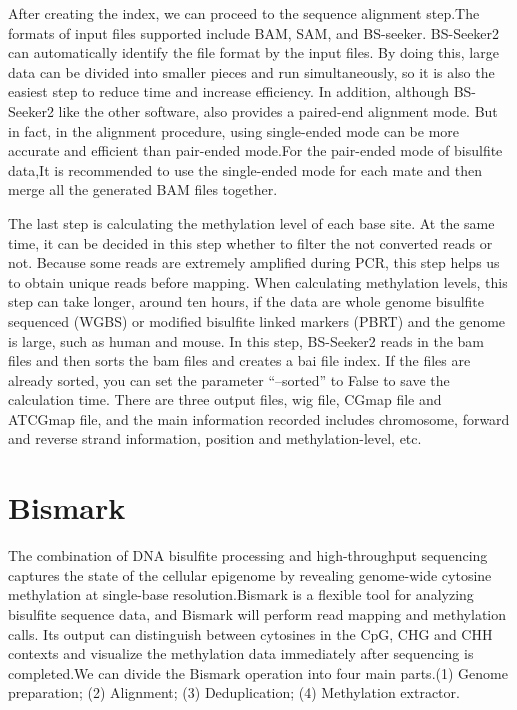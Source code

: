 \documentclass{PHlab-thesis}
\begin{document}
\par
After creating the index, we can proceed to the sequence alignment step.The formats of input files supported include BAM, SAM, and BS-seeker. BS-Seeker2 can automatically identify the file format by the input files. By doing this, large data can be divided into smaller pieces and run simultaneously, so it is also the easiest step to reduce time and increase efficiency. In addition, although BS-Seeker2 like the other software, also provides a paired-end alignment mode. But in fact, in the alignment procedure, using single-ended mode can be more accurate and efficient than pair-ended mode.For the pair-ended mode of bisulfite data,It is recommended to use the single-ended mode for each mate and then merge all the generated BAM files together.

\par
The last step is calculating the methylation level of each base site. At the same time, it can be decided in this step whether to filter the not converted reads or not. Because some reads are extremely amplified during PCR, this step helps us to obtain unique reads before mapping. When calculating methylation levels, this step can take longer, around ten hours, if the data are whole genome bisulfite sequenced (WGBS) or modified bisulfite linked markers (PBRT) and the genome is large, such as human and mouse. In this step, BS-Seeker2 reads in the bam files and then sorts the bam files and creates a bai file index. If the files are already sorted, you can set the parameter “–sorted” to False to save the calculation time. There are three output files, wig file, CGmap file and ATCGmap file, and the main information recorded includes chromosome, forward and reverse strand information, position and methylation-level, etc.

\section{Bismark}
The combination of DNA bisulfite processing and high-throughput sequencing captures the state of the cellular epigenome by revealing genome-wide cytosine methylation at single-base resolution.Bismark is a flexible tool for analyzing bisulfite sequence data, and Bismark will perform read mapping and methylation calls\cite{krueger2011bismark}. Its output can distinguish between cytosines in the CpG, CHG and CHH contexts and visualize the methylation data immediately after sequencing is completed.We can divide the Bismark operation into four main parts.(1) Genome preparation; (2) Alignment; (3) Deduplication; (4) Methylation extractor.
\end{document}
